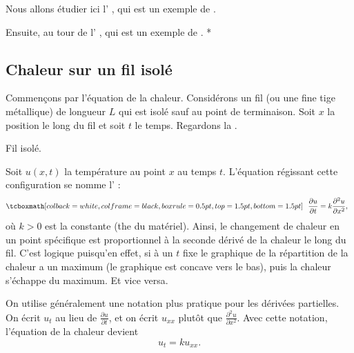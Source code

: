Nous allons étudier ici l'
\emph{}, qui est un exemple de \emph{}.  

Ensuite, au tour de l'
\emph{}, qui est un exemple de \emph{}.  
*%

\subsection{Chaleur sur un fil isolé}

Commençons par l'équation de la chaleur.
Considérons un fil (ou une fine tige métallique) de longueur $ L $
qui est isolé sauf au point de terminaison.  Soit $ x $ la position le long du fil et soit $ t $ le temps.  Regardons la .

\begin{myfig}
\capstart
{}
\caption{Fil isolé.\label{heat:wirefig}}
\end{myfig}

Soit $u(x,t)$ la température au point $ x $ au temps $ t $.
L'équation régissant cette configuration se nomme l' \emph{}:
\begin{equation*}
\mybxbg{~~
\frac{\partial u}{\partial t} =
k \frac{\partial^2 u}{\partial x^2} ,
~~}
\end{equation*}
où $k > 0$ est la constante (the \emph{} du matériel).
Ainsi, le changement de chaleur en un point spécifique est proportionnel à la seconde
dérivé de la chaleur le long du fil.  C'est logique puisqu'en effet,
si à un $ t $ fixe le graphique de la répartition de la chaleur a un maximum (le graphique est concave vers le bas),
puis la chaleur s'échappe du maximum.  Et vice versa.

On utilise généralement une notation plus pratique pour les dérivées partielles.
On écrit $ u_t $ au lieu de $\frac{\partial u}{\partial t}$,
et on écrit $u_{xx}$ plutôt que $\frac{\partial^2 u}{\partial x^2}$.
Avec cette notation,  l'équation de la chaleur devient 
\begin{equation*}
u_t = k u_{xx} .
\end{equation*}

